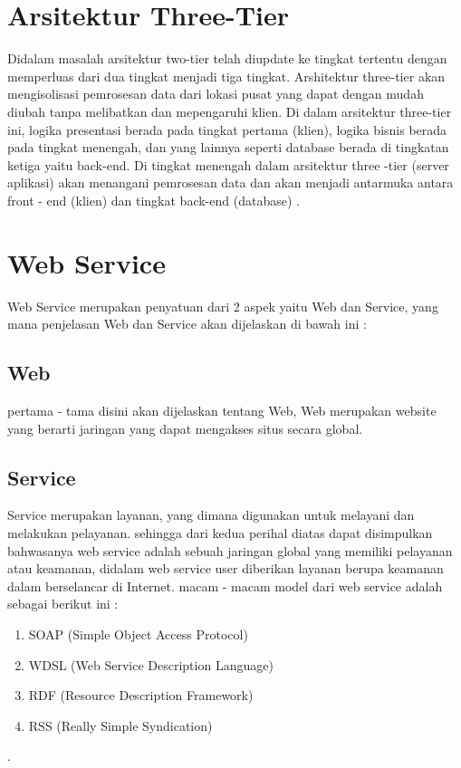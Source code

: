 \section{Arsitektur Three-Tier}
	Didalam masalah arsitektur two-tier telah diupdate ke tingkat tertentu dengan memperluas dari dua tingkat menjadi tiga tingkat.
Arshitektur three-tier akan mengisolisasi pemrosesan data dari lokasi pusat yang dapat dengan mudah diubah tanpa melibatkan dan mepengaruhi klien. Di dalam arsitektur three-tier ini, logika presentasi berada pada tingkat pertama (klien), logika bisnis berada pada 
tingkat menengah, dan yang lainnya seperti database berada di tingkatan ketiga yaitu back-end. Di tingkat menengah dalam
arsitektur three -tier (server aplikasi) akan menangani pemrosesan data dan akan menjadi antarmuka antara front - end (klien) dan
tingkat back-end (database)
\cite{demurjian1986multi}.


\section{Web Service}
	Web Service merupakan penyatuan dari 2 aspek yaitu Web dan Service, yang mana penjelasan Web dan Service akan dijelaskan di bawah ini :

\subsection{Web}
	pertama - tama disini akan dijelaskan tentang Web, Web merupakan website yang berarti 
jaringan yang dapat mengakses situs secara global.

\subsection{Service}
	Service merupakan layanan, yang dimana digunakan untuk melayani dan melakukan pelayanan.
sehingga dari kedua perihal diatas dapat disimpulkan bahwasanya web service adalah sebuah jaringan global yang memiliki pelayanan atau keamanan,
didalam web service user diberikan layanan berupa keamanan dalam berselancar di Internet. 
macam - macam model dari web service adalah sebagai berikut ini :

\begin{enumerate}
\item SOAP (Simple Object Access Protocol)
\item WDSL (Web Service Description Language)
\item RDF (Resource Description Framework)
\item RSS (Really Simple Syndication)
\end {enumerate}
\cite{curbera2001web}.


